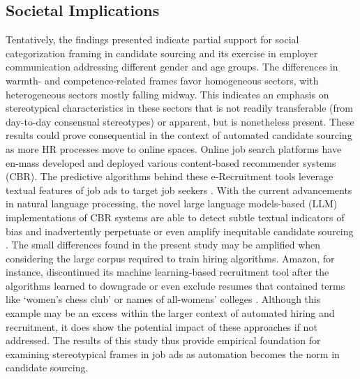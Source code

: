 \documentclass[man]{apa7}
\begin{document}
\subsection{Societal Implications}
\label{implications}
Tentatively, the findings presented indicate partial support for social categorization framing in candidate sourcing and its exercise in employer communication addressing different gender and age groups. The differences in warmth- and competence-related frames favor homogeneous sectors, with heterogeneous sectors mostly falling midway. This indicates an emphasis on stereotypical characteristics in these sectors that is not readily transferable (from day-to-day consensual stereotypes) or apparent, but is nonetheless present.
These results could prove consequential in the context of automated candidate sourcing as more HR processes move to online spaces. Online job search platforms have en-mass developed and deployed various content-based recommender systems (CBR). The predictive algorithms behind these e-Recruitment tools leverage textual features of job ads to target job seekers \parencite{pejic-bach_text_2020, shi2020SalienceMarketawareSkill}. With the current advancements in natural language processing, the novel large language models-based (LLM) implementations of CBR systems are able to detect subtle textual indicators of bias and inadvertently perpetuate or even amplify inequitable candidate sourcing \parencite{singhal_use_2017}. The small differences found in the present study may be amplified when considering the large corpus required to train hiring algorithms. Amazon, for instance, discontinued its machine learning-based recruitment tool after the algorithms learned to downgrade or even exclude resumes that contained terms like ‘women’s chess club’ or names of all-womens’ colleges \parencite{dastin2018AmazonScrapsSecret}. Although this example may be an excess within the larger context of automated hiring and recruitment, it does show the potential impact of these approaches if not addressed. The results of this study thus provide empirical foundation for examining stereotypical frames in job ads as automation becomes the norm in candidate sourcing.
\end{document}
